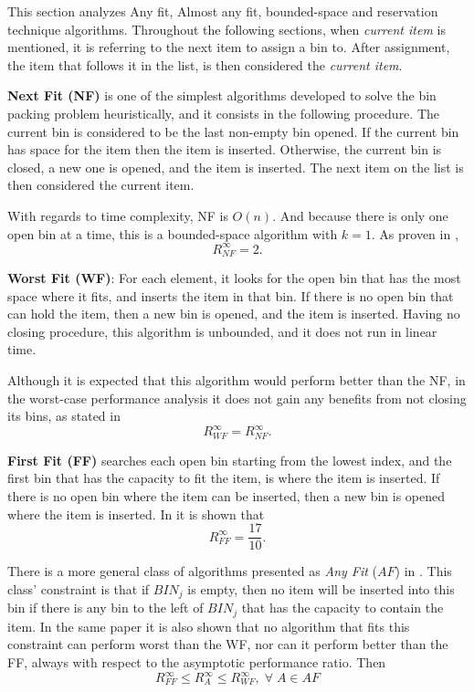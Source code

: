 This section analyzes Any fit, Almost any fit, bounded-space and reservation
technique algorithms.  Throughout the following sections, when \textit{current
item} is mentioned, it is referring to the next item to assign a bin to. After
assignment, the item that follows it in the list, is then considered the
\textit{current item}.

\textbf{Next Fit (NF)} is one of the simplest algorithms developed to solve the
bin packing problem heuristically, and it consists in the following procedure.
The current bin is considered to be the last non-empty bin opened. If the
current bin has space for the item then the item is inserted. Otherwise, the
current bin is closed, a new one is opened, and the item is inserted. The next
item on the list is then considered the current item.

With regards to time complexity, NF is $O(n)$. And because there is only one
open bin at a time, this is a bounded-space algorithm with $k = 1$. As proven in
\cite{johnson1973near}, 
\begin{equation}
    R_{NF}^\infty = 2.
\end{equation}

\textbf{Worst Fit (WF)}: For each element, it looks for the open bin that has
the most space where it fits, and inserts the item in that bin. If there is no
open bin that can hold the item, then a new bin is opened, and the item is
inserted. Having no closing procedure, this algorithm is unbounded, and it does
not run in linear time.

Although it is expected that this algorithm would perform better than the NF, in
the worst-case performance analysis it does not gain any benefits from not
closing its bins, as stated in \cite{man1996approximation}
\begin{equation}
    R_{WF}^\infty = R_{NF}^\infty.
\end{equation}

\textbf{First Fit (FF)} searches each open bin starting from the lowest index,
and the first bin that has the capacity to fit the item, is where the item is
inserted. If there is no open bin where the item can be inserted, then a new bin
is opened where the item is inserted. In \cite{johnson1974worst} it is shown
that
\begin{equation}
    R_{FF}^\infty = \frac{17}{10}.
\end{equation}

There is a more general class of algorithms presented as \textit{Any Fit} ($AF$)
in \cite{johnson1974fast}. This class' constraint is that if $BIN_j$ is empty,
then no item will be inserted into this bin if there is any bin to the left of
$BIN_j$ that has the capacity to contain the item. In the same paper it is also
shown that no algorithm that fits this constraint can perform worst than the WF,
nor can it perform better than the FF, always with respect to the asymptotic
performance ratio. Then
\begin{equation}
    R_{FF}^\infty \leq R_A^\infty \leq R_{WF}^\infty, \; \forall \; A \in AF
\end{equation}

